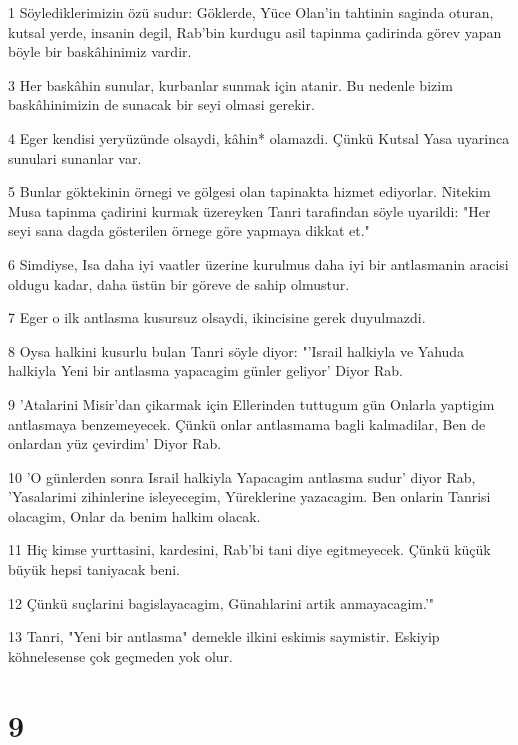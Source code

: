 \par 1 Söylediklerimizin özü sudur: Göklerde, Yüce Olan'in tahtinin saginda oturan, kutsal yerde, insanin degil, Rab'bin kurdugu asil tapinma çadirinda görev yapan böyle bir baskâhinimiz vardir.
\par 3 Her baskâhin sunular, kurbanlar sunmak için atanir. Bu nedenle bizim baskâhinimizin de sunacak bir seyi olmasi gerekir.
\par 4 Eger kendisi yeryüzünde olsaydi, kâhin* olamazdi. Çünkü Kutsal Yasa uyarinca sunulari sunanlar var.
\par 5 Bunlar göktekinin örnegi ve gölgesi olan tapinakta hizmet ediyorlar. Nitekim Musa tapinma çadirini kurmak üzereyken Tanri tarafindan söyle uyarildi: "Her seyi sana dagda gösterilen örnege göre yapmaya dikkat et."
\par 6 Simdiyse, Isa daha iyi vaatler üzerine kurulmus daha iyi bir antlasmanin aracisi oldugu kadar, daha üstün bir göreve de sahip olmustur.
\par 7 Eger o ilk antlasma kusursuz olsaydi, ikincisine gerek duyulmazdi.
\par 8 Oysa halkini kusurlu bulan Tanri söyle diyor: "'Israil halkiyla ve Yahuda halkiyla Yeni bir antlasma yapacagim günler geliyor' Diyor Rab.
\par 9 'Atalarini Misir'dan çikarmak için Ellerinden tuttugum gün Onlarla yaptigim antlasmaya benzemeyecek. Çünkü onlar antlasmama bagli kalmadilar, Ben de onlardan yüz çevirdim' Diyor Rab.
\par 10 'O günlerden sonra Israil halkiyla Yapacagim antlasma sudur' diyor Rab, 'Yasalarimi zihinlerine isleyecegim, Yüreklerine yazacagim. Ben onlarin Tanrisi olacagim, Onlar da benim halkim olacak.
\par 11 Hiç kimse yurttasini, kardesini, Rab'bi tani diye egitmeyecek. Çünkü küçük büyük hepsi taniyacak beni.
\par 12 Çünkü suçlarini bagislayacagim, Günahlarini artik anmayacagim.'"
\par 13 Tanri, "Yeni bir antlasma" demekle ilkini eskimis saymistir. Eskiyip köhnelesense çok geçmeden yok olur.

\chapter{9}

